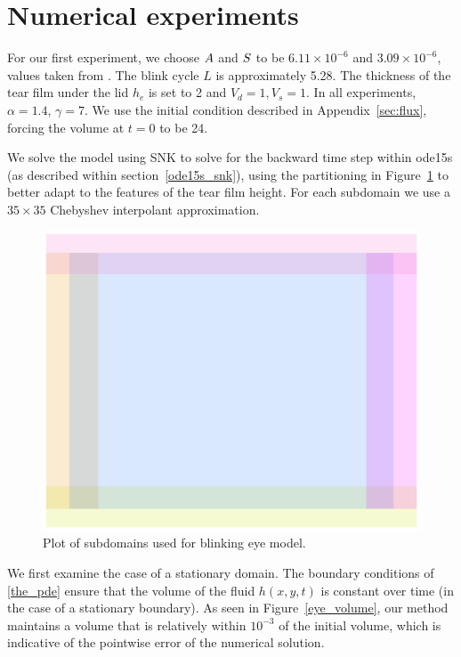 \section{Numerical experiments}
\label{eye_experiments}
For our first experiment, we choose $A$ and $S$ to be $6.11 \times 10^{-6}$ and $3.09 \times 10^{-6}$, values taken from \cite{braun2015dynamics}. The blink cycle $L$ is approximately 5.28. The thickness of the tear film under the lid $h_e$ is set to 2 and $V_d=1, V_s=1$. In all experiments, $\alpha=1.4$, $\gamma=7$. We use the initial condition described in Appendix~\ref{sec:flux}, forcing the volume at $t=0$ to be 24.

We solve the model using SNK to solve for the backward time step within ode15s (as described within section~\ref{ode15s_snk}), using the partitioning in Figure~\ref{eye_partition} to better adapt to the features of the tear film height. For each subdomain we use a $35 \times 35$ Chebyshev interpolant approximation.
\begin{figure}
	\centering
	\includegraphics[scale=0.6]{Chapter4/Eye_domains}
	\caption{Plot of subdomains used for blinking eye model.}
	\label{eye_partition}
\end{figure}

We first examine the case of a stationary domain. The boundary conditions of \ref{the_pde} ensure that the volume of the fluid $h(x,y,t)$ is constant over time (in the case of a stationary boundary). As seen in Figure~\ref{eye_volume}, our method maintains a volume that is relatively within $10^{-3}$ of the initial volume, which is indicative of the pointwise error of the numerical solution.

